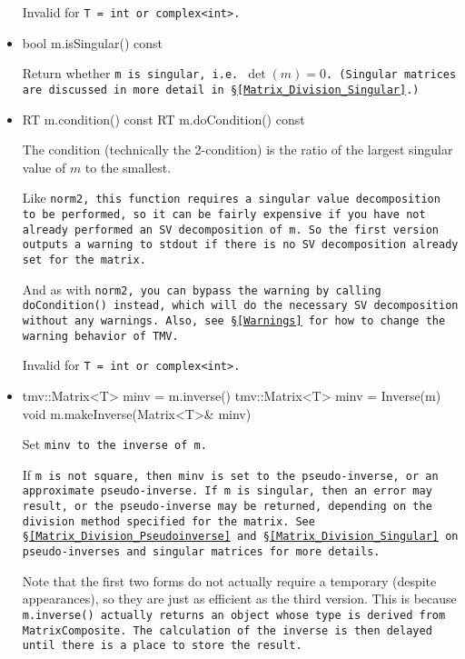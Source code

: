 \begin{itemize}
Invalid for \tt{T = int} or \tt{complex<int>}.

\item
\begin{tmvcode}
bool m.isSingular() const
\end{tmvcode}
Return whether \tt{m} is singular, i.e. $\det(m) = 0$.
(Singular matrices are discussed in more detail in \S\ref{Matrix_Division_Singular}.)

\item
\begin{tmvcode}
RT m.condition() const
RT m.doCondition() const
\end{tmvcode}
The condition (technically the 2-condition) is 
the ratio of the largest singular value of $m$ to the smallest.

Like \tt{norm2}, this function requires a singular value decomposition to be performed,
so it can be fairly expensive if you have not
already performed an SV decomposition of \tt{m}.
So the first version
outputs a warning to \tt{stdout} if there is no SV decomposition already set for the matrix.

And as with \tt{norm2}, you can bypass the warning by calling \tt{doCondition()} instead,
which will do the necessary SV decomposition without any warnings.  
Also, see \S\ref{Warnings} for how to change the warning behavior of TMV.

Invalid for \tt{T = int} or \tt{complex<int>}.

\item
\begin{tmvcode}
tmv::Matrix<T> minv = m.inverse()
tmv::Matrix<T> minv = Inverse(m)
void m.makeInverse(Matrix<T>& minv)
\end{tmvcode}
Set \tt{minv} to the inverse of \tt{m}.    

If \tt{m} is not square, then \tt{minv} is set to the pseudo-inverse, or an approximate
pseudo-inverse.  If \tt{m} is singular, then an error may result, or the pseudo-inverse
may be returned, depending on the division method specified for the matrix.  
See \S\ref{Matrix_Division_Pseudoinverse} and \S\ref{Matrix_Division_Singular} 
on pseudo-inverses and singular matrices for more details.

Note that the first two forms do not actually require a 
temporary (despite appearances), so they are just as efficient as the third version.
This is because \tt{m.inverse()} actually returns an object whose type is derived from
\tt{MatrixComposite}.  The calculation of the inverse is then delayed 
until there is a place to store the result.


\end{itemize}
